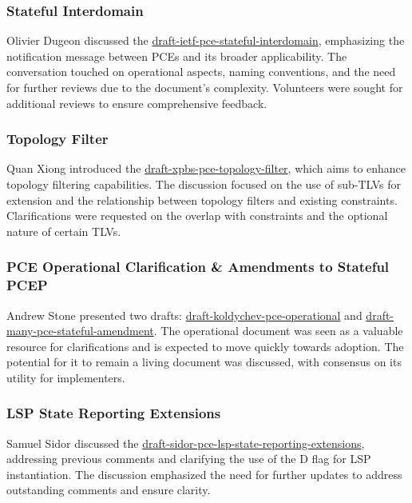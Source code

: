 \documentclass{article}
\begin{document}
\subsubsection{Stateful Interdomain}
Olivier Dugeon discussed the \href{https://datatracker.ietf.org/doc/draft-ietf-pce-stateful-interdomain/}{draft-ietf-pce-stateful-interdomain}, emphasizing the notification message between PCEs and its broader applicability. The conversation touched on operational aspects, naming conventions, and the need for further reviews due to the document's complexity. Volunteers were sought for additional reviews to ensure comprehensive feedback.

\subsubsection{Topology Filter}
Quan Xiong introduced the \href{https://datatracker.ietf.org/doc/draft-xpbs-pce-topology-filter/}{draft-xpbs-pce-topology-filter}, which aims to enhance topology filtering capabilities. The discussion focused on the use of sub-TLVs for extension and the relationship between topology filters and existing constraints. Clarifications were requested on the overlap with constraints and the optional nature of certain TLVs.

\subsubsection{PCE Operational Clarification \& Amendments to Stateful PCEP}
Andrew Stone presented two drafts: \href{https://datatracker.ietf.org/doc/draft-koldychev-pce-operational/}{draft-koldychev-pce-operational} and \href{https://datatracker.ietf.org/doc/draft-many-pce-stateful-amendment/}{draft-many-pce-stateful-amendment}. The operational document was seen as a valuable resource for clarifications and is expected to move quickly towards adoption. The potential for it to remain a living document was discussed, with consensus on its utility for implementers.

\subsubsection{LSP State Reporting Extensions}
Samuel Sidor discussed the \href{https://datatracker.ietf.org/doc/draft-sidor-pce-lsp-state-reporting-extensions/}{draft-sidor-pce-lsp-state-reporting-extensions}, addressing previous comments and clarifying the use of the D flag for LSP instantiation. The discussion emphasized the need for further updates to address outstanding comments and ensure clarity.
\end{document}
